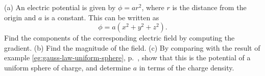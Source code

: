 (a) An electric potential is given by $\phi=ar^2$, where $r$ is the distance
from the origin and $a$ is a constant. This can be written as
\begin{equation*}
  \phi = a(x^2+y^2+z^2).
\end{equation*}
Find the components of the corresponding electric field by computing the
gradient.\hwendpart
(b) Find the magnitude of the field.\answercheck\hwendpart
(c) By comparing with the result of example \ref{eg:gauss-law-uniform-sphere},
p.~\pageref{eg:gauss-law-uniform-sphere}, show that this is the potential of
a uniform sphere of charge, and determine $a$ in terms of the charge density.\answercheck

